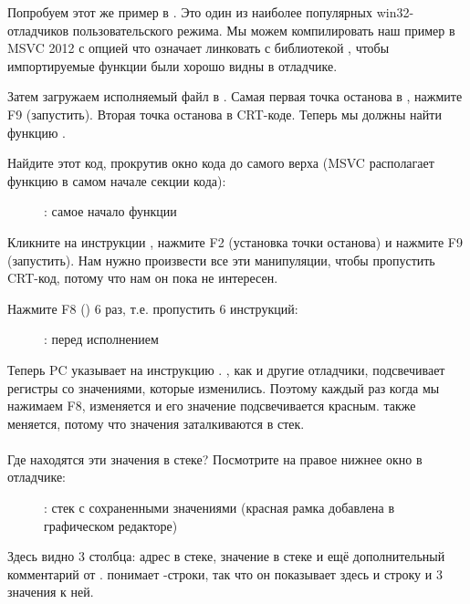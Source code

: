 Попробуем этот же пример в \olly.
Это один из наиболее популярных win32-отладчиков пользовательского режима.
Мы можем компилировать наш пример в MSVC 2012 
с опцией  что означает линковать с библиотекой ,
чтобы импортируемые функции были хорошо видны в отладчике.

Затем загружаем исполняемый файл в \olly.
Самая первая точка останова в , нажмите F9 (запустить).
Вторая точка останова в \ac{CRT}-коде.
Теперь мы должны найти функцию \main.

Найдите этот код, прокрутив окно кода до самого верха (MSVC располагает функцию \main в самом начале секции кода): 

\begin{figure}[H]
\centering
{}
\caption{\olly: самое начало функции \main}
\label{fig:printf3_olly_1}
\end{figure}

Кликните на инструкции , нажмите F2 (установка точки останова) и нажмите F9 (запустить).
Нам нужно произвести все эти манипуляции, чтобы пропустить \ac{CRT}-код, потому что нам он пока
не интересен.

\clearpage
Нажмите F8 (\stepover) 6 раз, т.е. пропустить 6 инструкций:

\begin{figure}[H]
\centering
{}
\caption{\olly: перед исполнением \printf}
\label{fig:printf3_olly_2}
\end{figure}

Теперь \ac{PC} указывает на инструкцию .
\olly, как и другие отладчики, подсвечивает регистры со значениями, которые изменились.
Поэтому каждый раз когда мы нажимаем F8, \EIP изменяется и его значение подсвечивается красным.
\ESP также меняется, потому что значения заталкиваются в стек.\\
\\
Где находятся эти значения в стеке?
Посмотрите на правое нижнее окно в отладчике:

\begin{figure}[H]
\centering

\caption{\olly: стек с сохраненными значениями (красная рамка добавлена в графическом редакторе)}
\end{figure}

Здесь видно 3 столбца: адрес в стеке, значение в стеке и ещё дополнительный комментарий
от \olly. 
\olly понимает \printf{}-строки, так что он показывает здесь и строку и 3 значения  к ней.

